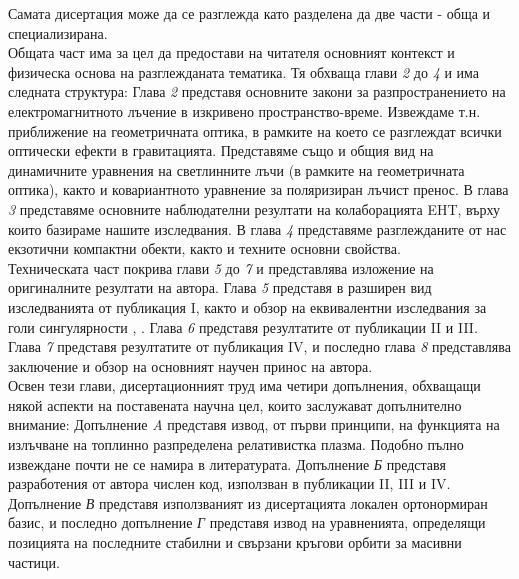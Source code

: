 Самата дисертация може да се разглежда като разделена да две части - обща и специализирана.\\

Общата част има за цел да предостави на читателя основният контекст и физическа основа на разглежданата тематика. Тя обхваща глави \emph{2} до \emph{4} и има следната структура: Глава \emph{2} представя основните закони за разпространението на електромагнитното лъчение в изкривено пространство-време. Извеждаме т.н. приближение на геометричната оптика, в рамките на което се разглеждат всички оптически ефекти в гравитацията. Представяме също и общия вид на динамичните уравнения на светлинните лъчи (в рамките на геометричната оптика), както и ковариантното уравнение за поляризиран лъчист пренос. В глава \emph{3} представяме основните наблюдателни резултати на колаборацията EHT, върху които базираме нашите изследвания. В глава \emph{4} представяме разглежданите от нас екзотични компактни обекти, както и техните основни свойства.\\

\noindent Техническата част покрива глави \emph{5} до \emph{7} и представлява изложение на оригиналните резултати на автора. Глава \emph{5} представя в разширен вид изследванията от публикация I, както и обзор на еквивалентни изследвания за голи сингулярности \cite{Gyulchev2020}, \cite{Gyulchev2021}. Глава \emph{6} представя резултатите от публикации II и III. Глава \emph{7} представя резултатите от публикация IV, и последно глава \emph{8} представлява заключение и обзор на основният научен принос на автора.\\

\noindent Освен тези глави, дисертационният труд има четири допълнения, обхващащи някой аспекти на поставената научна цел, които заслужават допълнително внимание: Допълнение \emph{A} представя извод, от първи принципи, на функцията на излъчване на топлинно разпределена релативистка плазма. Подобно пълно извеждане почти не се намира в литературата. Допълнение \emph{Б} представя разработения от автора числен код, използван в публикации II, III и IV. Допълнение \emph{В} представя използваният из дисертацията локален ортонормиран базис, и последно допълнение \emph{Г} представя извод на уравненията, определящи позицията на последните стабилни и свързани кръгови орбити за масивни частици.